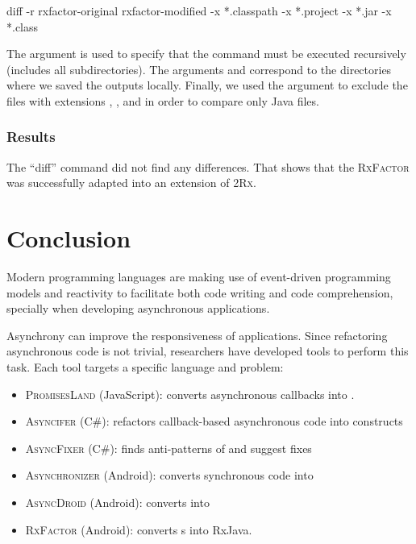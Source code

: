 \documentclass[type=bsc,accentcolor=tud9c]{tudthesis}
\newcommand{\framework}[1]{\textcolor{black!65}{#1}}
\newcommand{\toolcore}{\textsc{2Rx}}
\begin{document}
\begin{textcode}{}
diff -r rxfactor-original rxfactor-modified -x *.classpath -x *.project -x *.jar -x *.class
\end{textcode}

The argument  is used to specify that the command must be executed recursively (includes all subdirectories). The arguments  and  correspond to the directories where we saved the outputs locally. Finally, we used the argument  to exclude the files with extensions , ,  and  in order to compare only \framework{Java} files.

\subsection{Results}
The ``diff'' command did not find any differences. That shows that the \textsc{RxFactor} was successfully adapted into an extension of \toolcore{}.

\chapter{Conclusion}
\label{chapter:conclusion}
Modern programming languages are making use of event-driven programming models and reactivity to facilitate both code writing and code comprehension, specially when developing asynchronous applications.

Asynchrony can improve the responsiveness of applications. Since refactoring asynchronous code is not trivial, researchers have developed tools to perform this task. Each tool targets a specific language and problem:

\begin{itemize}
	\item \textsc{PromisesLand} (JavaScript): converts asynchronous callbacks into .
	\item \textsc{Asyncifer} (C\#): refactors callback-based asynchronous code into  constructs
	\item \textsc{AsyncFixer} (C\#): finds anti-patterns of  and suggest fixes
	\item \textsc{Asynchronizer} (Android): converts synchronous code into 
	\item \textsc{AsyncDroid} (Android): converts  into 
	\item \textsc{RxFactor} (Android): converts s into \framework{RxJava}.
\end{itemize}
\end{document}
